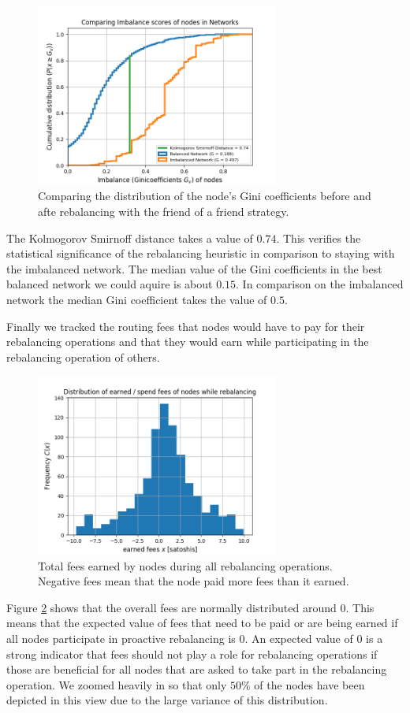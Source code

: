 \documentclass[a4paper]{paper}
\begin{document}
\begin{figure}
 \centering
 \includegraphics[width=8cm]{code/vs/fig/comparison distribution of Ginicoefficients.png}
 \caption{Comparing the distribution of the node's Gini coefficients before and afte rebalancing with the friend of a friend strategy.}
 \label{fig:cdf_gini}
 \end{figure}
 The Kolmogorov Smirnoff distance takes a value of $0.74$.
 This verifies the statistical significance of the rebalancing heuristic in comparison to staying with the imbalanced network.
The median value of the Gini coefficients in the best balanced network we could aquire is about $0.15$.
 In comparison on the imbalanced network the median Gini coefficient takes the value of $0.5$.

Finally we tracked the routing fees that nodes would have to pay for their rebalancing operations and that they would earn while participating in the rebalancing operation of others.
 \begin{figure}
 \centering
 \includegraphics[width=8cm]{code/vs/fig/distribution_of_fees.png}
 \caption{Total fees earned by nodes during all rebalancing operations. Negative fees mean that the node paid more fees than it earned.}
 \label{fig:fees}
 \end{figure}
 Figure \cref{fig:fees} shows that the overall fees are normally distributed around $0$.
 This means that the expected value of fees that need to be paid or are being earned if all nodes participate in proactive rebalancing is $0$.
An expected value of $0$ is a strong indicator that fees should not play a role for rebalancing operations if those are beneficial for all nodes that are asked to take part in the rebalancing operation.
 We zoomed heavily in so that only $50\%$ of the nodes have been depicted in this view due to the large variance of this distribution.
\end{document}
